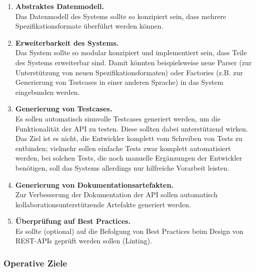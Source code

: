 \begin{enumerate}
	\item \textbf{Abstraktes Datenmodell.} \\
	Das Datenmodell des Systems sollte so konzipiert sein, dass mehrere Spezifikationsformate überführt werden können.
	\item \textbf{Erweiterbarkeit des Systems.} \\
	Das System sollte so modular konzipiert und implementiert sein, dass Teile des Systems erweiterbar sind. Damit könnten beispielsweise neue Parser (zur Unterstützung von neuen Spezifikationsformaten) oder Factories (z.B. zur Generierung von Testcases in einer anderen Sprache) in das System eingebunden werden.
	\item \textbf{Generierung von Testcases.} \\
	Es sollen automatisch sinnvolle Testcases generiert werden, um die Funktionalität der API zu testen. Diese sollten dabei unterstützend wirken. Das Ziel ist es nicht, die Entwickler komplett vom Schreiben von Tests zu entbinden; vielmehr sollen einfache Tests zwar komplett automatisiert werden, bei solchen Tests, die noch manuelle Ergänzungen der Entwickler benötigen, soll das Systems allerdings nur hilfreiche Vorarbeit leisten.  
	\item \textbf{Generierung von Dokumentationsartefakten.} \\
	Zur Verbesserung der Dokumentation der API sollen automatisch kollaborationsunterstützende Artefakte generiert werden.
	\item \textbf{Überprüfung auf Best Practices.}  \\
	Es sollte (optional) auf die Befolgung von Best Practices beim Design von REST-APIs geprüft werden sollen (Linting). 
	
\end{enumerate}


\subsubsection{Operative Ziele}

